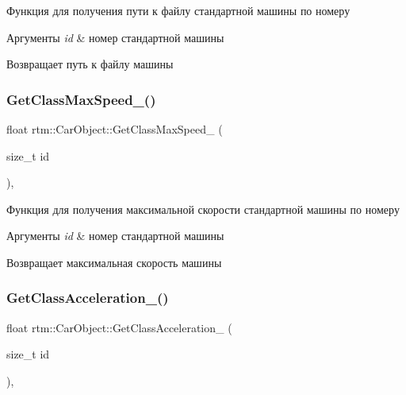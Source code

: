 Функция для получения пути к файлу стандартной машины по номеру 
\begin{DoxyParams}{Аргументы}
{\em id} & номер стандартной машины \\
\hline
\end{DoxyParams}
\begin{DoxyReturn}{Возвращает}
путь к файлу машины 
\end{DoxyReturn}
\mbox{\label{classrtm_1_1_car_object_a0e69f04edd9f51f57a1d0fd39e2b0976}} 
\subsubsection{\texorpdfstring{Get\+Class\+Max\+Speed\+\_\+()}{GetClassMaxSpeed\_()}}
{\footnotesize\ttfamily float rtm\+::\+Car\+Object\+::\+Get\+Class\+Max\+Speed\+\_\+ (\begin{DoxyParamCaption}\item[{size\+\_\+t}]{id }\end{DoxyParamCaption})\hspace{0.3cm}{\ttfamily [static]}, {\ttfamily [private]}}

Функция для получения максимальной скорости стандартной машины по номеру 
\begin{DoxyParams}{Аргументы}
{\em id} & номер стандартной машины \\
\hline
\end{DoxyParams}
\begin{DoxyReturn}{Возвращает}
максимальная скорость машины 
\end{DoxyReturn}
\mbox{\label{classrtm_1_1_car_object_a45d798bf2079173c677358b4b54d4e2b}} 
\subsubsection{\texorpdfstring{Get\+Class\+Acceleration\+\_\+()}{GetClassAcceleration\_()}}
{\footnotesize\ttfamily float rtm\+::\+Car\+Object\+::\+Get\+Class\+Acceleration\+\_\+ (\begin{DoxyParamCaption}\item[{size\+\_\+t}]{id }\end{DoxyParamCaption})\hspace{0.3cm}{\ttfamily [static]}, {\ttfamily [private]}}

